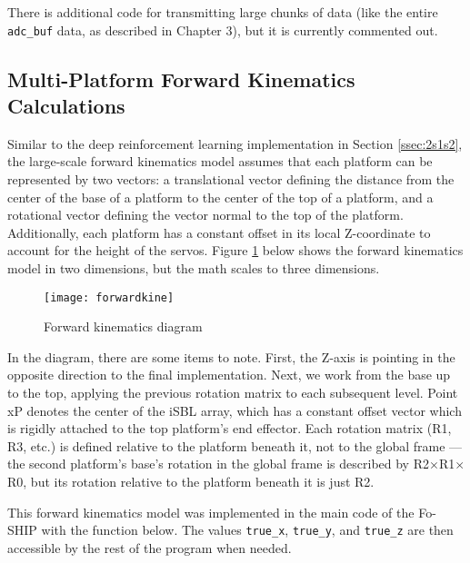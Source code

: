 \documentclass[11pt]{ucthesisCP}
\begin{document}
There is additional code for transmitting large chunks of data (like the entire \verb|adc_buf| data, as described in Chapter 3), but it is currently commented out.

\subsection{Multi-Platform Forward Kinematics Calculations} \label{ssec:2s5s4}
Similar to the deep reinforcement learning implementation in Section \ref{ssec:2s1s2}, the large-scale forward kinematics model assumes that each platform can be represented by two vectors: a translational vector defining the distance from the center of the base of a platform to the center of the top of a platform, and a rotational vector defining the vector normal to the top of the platform. Additionally, each platform has a constant offset in its local Z-coordinate to account for the height of the servos. Figure \ref{fig:forwardkine} below shows the forward kinematics model in two dimensions, but the math scales to three dimensions.

\begin{figure}[!htbp]
	\centering
	\texttt{[image: forwardkine]}
	\caption{Forward kinematics diagram}
	\label{fig:forwardkine}
\end{figure}

In the diagram, there are some items to note. First, the Z-axis is pointing in the opposite direction to the final implementation. Next, we work from the base up to the top, applying the previous rotation matrix to each subsequent level. Point xP denotes the center of the iSBL array, which has a constant offset vector which is rigidly attached to the top platform’s end effector. Each rotation matrix (R1, R3, etc.) is defined relative to the platform beneath it, not to the global frame --- the second platform’s base’s rotation in the global frame is described by R2\(\times\)R1\(\times\)R0, but its rotation relative to the platform beneath it is just R2.

This forward kinematics model was implemented in the main code of the Fo-SHIP with the function below. The values \verb|true_x|, \verb|true_y|, and \verb|true_z| are then accessible by the rest of the program when needed.
\end{document}
